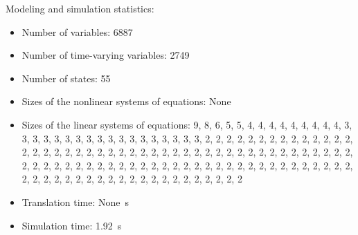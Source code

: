 \begin{contextbox}
  Modeling and simulation statistics:
  \begin{itemize}
    \item Number of variables: 6887
    \item Number of time-varying variables: 2749
    \item Number of states: 55
    \item Sizes of the nonlinear systems of equations: None
    \item Sizes of the linear systems of equations: 9, 8, 6, 5, 5, 4, 4, 4, 4, 4, 4, 4, 4, 4, 3, 3, 3, 3, 3, 3, 3, 3, 3, 3, 3, 3, 3, 3, 3, 3, 3, 3, 2, 2, 2, 2, 2, 2, 2, 2, 2, 2, 2, 2, 2, 2, 2, 2, 2, 2, 2, 2, 2, 2, 2, 2, 2, 2, 2, 2, 2, 2, 2, 2, 2, 2, 2, 2, 2, 2, 2, 2, 2, 2, 2, 2, 2, 2, 2, 2, 2, 2, 2, 2, 2, 2, 2, 2, 2, 2, 2, 2, 2, 2, 2, 2, 2, 2, 2, 2, 2, 2, 2, 2, 2, 2, 2, 2, 2, 2, 2, 2, 2, 2, 2, 2, 2, 2, 2, 2, 2, 2, 2, 2, 2, 2, 2, 2, 2
    \item Translation time: \SI{None}{s}
    \item Simulation time: \SI{1.92}{s}
  \end{itemize}
\end{contextbox}